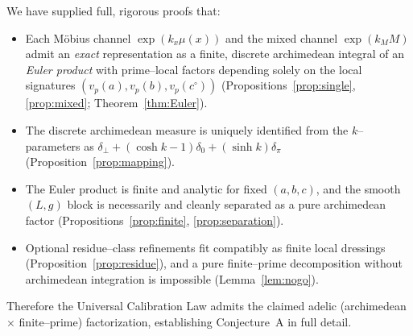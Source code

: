 \documentclass[12pt]{article}
\numberwithin{equation}{section}
\begin{document}
We have supplied full, rigorous proofs that:
\begin{itemize}
\item Each Möbius channel $\exp(k_x\mu(x))$ and the mixed channel $\exp(k_M M)$ admit an \emph{exact} representation as a finite, discrete archimedean integral of an \emph{Euler product} with prime–local factors depending solely on the local signatures $(v_p(a),v_p(b),v_p(c^\circ))$ (Propositions~\ref{prop:single}, \ref{prop:mixed}; Theorem~\ref{thm:Euler}).
\item The discrete archimedean measure is uniquely identified from the $k$–parameters as $\delta_{\bot}+(\cosh k-1)\delta_{0}+(\sinh k)\delta_{\pi}$ (Proposition~\ref{prop:mapping}).
\item The Euler product is finite and analytic for fixed $(a,b,c)$, and the smooth $(L,g)$ block is necessarily and cleanly separated as a pure archimedean factor (Propositions~\ref{prop:finite}, \ref{prop:separation}).
\item Optional residue–class refinements fit compatibly as finite local dressings (Proposition~\ref{prop:residue}), and a pure finite–prime decomposition without archimedean integration is impossible (Lemma~\ref{lem:nogo}).
\end{itemize}
Therefore the Universal Calibration Law admits the claimed adelic (archimedean $\times$ finite–prime) factorization, establishing Conjecture~A in full detail.
\end{document}
